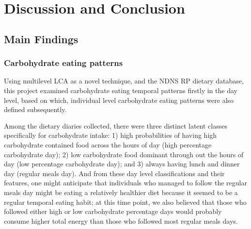 
\chapter{Discussion and Conclusion} %

\label{Chapter 4} %






\section{Main Findings}

\subsection{Carbohydrate eating patterns}

Using multilevel LCA as a novel technique, and the NDNS RP dietary database, this project examined carbohydrate eating temporal patterns firstly in the day level, based on which, individual level carbohydrate eating patterns were also defined subsequently. 

Among the dietary diaries collected, there were three distinct latent classes specifically for carbohydrate intake: 1) high probabilities of having high carbohydrate contained food across the hours of day (high percentage carbohydrate day); 2) low carbohydrate food dominant through out the hours of day (low percentage carbohydrate day); and 3) always having lunch and dinner day (regular meals day). And from these day level classifications and their features, one might anticipate that individuals who managed to follow the regular meals day might be eating a relatively healthier diet because it seemed to be a regular temporal eating habit; at this time point, we also believed that those who followed either high or low carbohydrate percentage days would probably consume higher total energy than those who followed most regular meals days. 


